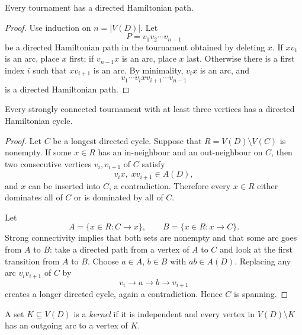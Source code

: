 \begin{notetheorem}
Every tournament has a directed Hamiltonian path.
\end{notetheorem}
\begin{proof}
Use induction on $n=|V(D)|$.  Let
\[
  P=v_1v_2\cdots v_{n-1}
\]
be a directed Hamiltonian path in the tournament obtained by deleting $x$.  If $xv_1$ is an arc, place $x$ first; if $v_{n-1}x$ is an arc, place $x$ last.  Otherwise there is a first index $i$ such that $xv_{i+1}$ is an arc.  By minimality, $v_ix$ is an arc, and
\[
  v_1\cdots v_i x v_{i+1}\cdots v_{n-1}
\]
is a directed Hamiltonian path.
\end{proof}
\begin{notetheorem}
Every strongly connected tournament with at least three vertices has a directed Hamiltonian cycle.
\end{notetheorem}
\begin{proof}
Let $C$ be a longest directed cycle.  Suppose that $R=V(D)\setminus V(C)$ is nonempty.  If some $x\in R$ has an in-neighbour and an out-neighbour on $C$, then two consecutive vertices $v_i,v_{i+1}$ of $C$ satisfy
\[
  v_i x,\; xv_{i+1}\in A(D),
\]
and $x$ can be inserted into $C$, a contradiction.  Therefore every $x\in R$ either dominates all of $C$ or is dominated by all of $C$.

Let
\[
  A=\{x\in R:C\to x\},
  \qquad
  B=\{x\in R:x\to C\}.
\]
Strong connectivity implies that both sets are nonempty and that some arc goes from $A$ to $B$: take a directed path from a vertex of $A$ to $C$ and look at the first transition from $A$ to $B$.  Choose $a\in A$, $b\in B$ with $ab\in A(D)$.  Replacing any arc $v_iv_{i+1}$ of $C$ by
\[
  v_i\to a\to b\to v_{i+1}
\]
creates a longer directed cycle, again a contradiction.  Hence $C$ is spanning.
\end{proof}
\begin{notedefinition}
A set $K\subseteq V(D)$ is a \emph{kernel} if it is independent and every vertex in $V(D)\setminus K$ has an outgoing arc to a vertex of $K$.
\end{notedefinition}

